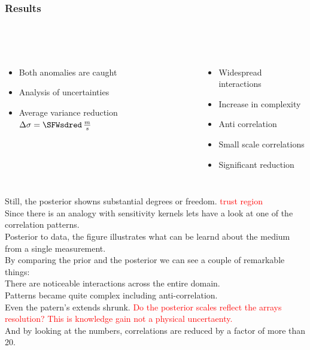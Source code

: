 \documentclass[aspectratio=169, t, 10pt,
    ]{beamer}
\newcommand\worries[1]{\textcolor{red}{#1}}
\begin{document}
\begin{frame}
    \frametitle{Results}
    \framesubtitle{~}

\begin{columns}
%

    \begin{itemize}
        \item Both anomalies are caught
        \item Analysis of uncertainties
        \item Average variance reduction $\Delta\sigma = \SFWsdred \, \frac ms$
    \end{itemize}
    \smallskip

    \begin{itemize}
        \item Widespread interactions
        \item Increase in complexity
        \item Anti correlation
        \item Small scale correlations
        \item Significant reduction
    \end{itemize}


    \vspace{-10mm}
    \centering \scriptsize
\end{columns}

\end{frame}

Still, the posterior showns substantial degrees or freedom.
\worries{trust region}
\\[2mm]

Since there is an analogy with sensitivity kernels lets have a look at one of the correlation patterns.
\\
Posterior to data, the figure illustrates what can be learnd about the medium from a single measurement.
\\
By comparing the prior and the posterior we can see a couple of remarkable things:
\\
There are noticeable interactions across the entire domain.
\\
Patterns became quite complex including anti-correlation.
\\
Even the patern's extends shrunk.
\worries{Do the posterior scales reflect the arrays resolution?
This is knowledge gain not a physical uncertaenty. }
\\
And by looking at the numbers, correlations are reduced by a factor of more than 20.
\end{document}
